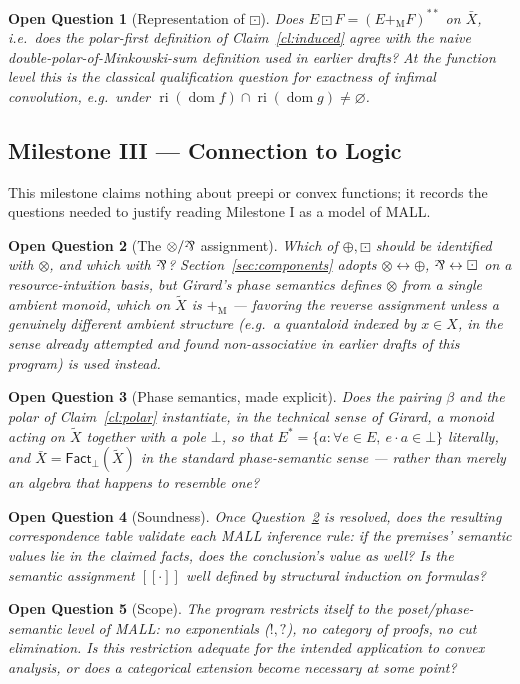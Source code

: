 \documentclass[11pt]{article}
\newtheorem{question}{Open Question}
\newcommand{\dom}{\operatorname{dom}}
\newcommand{\Msum}{+_{\mathrm M}}
\newcommand{\Fact}{\mathsf{Fact}}
\newcommand{\parr}{\mathbin{\text{\rotatebox[origin=c]{180}{\&}}}}
\newcommand{\ri}{\operatorname{ri}}
\providecommand{\llbracket}{[\![}
\providecommand{\rrbracket}{]\!]}
\begin{document}
\begin{question}[Representation of $\boxdot$]\label{q:representation}
Does $E\boxdot F=(E\Msum F)^{**}$ on $\bar X$, i.e.\ does the polar-first
definition of Claim~\ref{cl:induced} agree with the naive
double-polar-of-Minkowski-sum definition used in earlier drafts? At the
function level this is the classical qualification question for exactness
of infimal convolution, e.g.\ under $\ri(\dom f)\cap\ri(\dom g)\ne\varnothing$.
\end{question}

\subsection*{Milestone III --- Connection to Logic}

This milestone claims nothing about preepi or convex functions; it records
the questions needed to justify reading Milestone I as a model of MALL.

\begin{question}[The $\otimes/\parr$ assignment]\label{q:swap}
Which of $\oplus,\boxdot$ should be identified with $\otimes$, and which
with $\parr$? Section~\ref{sec:components} adopts
$\otimes\leftrightarrow\oplus$, $\parr\leftrightarrow\boxdot$ on a
resource-intuition basis, but Girard's phase semantics defines $\otimes$
from a single ambient monoid, which on $\tilde X$ is $\Msum$ — favoring
the reverse assignment unless a genuinely different ambient structure
(e.g.\ a quantaloid indexed by $x\in X$, in the sense already attempted
and found non-associative in earlier drafts of this program) is used
instead.
\end{question}

\begin{question}[Phase semantics, made explicit]
Does the pairing $\beta$ and the polar of Claim~\ref{cl:polar} instantiate,
in the technical sense of Girard, a monoid acting on $\tilde X$ together
with a pole $\bot$, so that $E^*=\{a:\forall e\in E,\ e\cdot a\in\bot\}$
literally, and $\bar X=\Fact_\bot(\tilde X)$ in the standard phase-semantic
sense — rather than merely an algebra that happens to resemble one?
\end{question}

\begin{question}[Soundness]
Once Question~\ref{q:swap} is resolved, does the resulting correspondence
table validate each MALL inference rule: if the premises' semantic values
lie in the claimed facts, does the conclusion's value as well? Is the
semantic assignment $\llbracket\cdot\rrbracket$ well defined by structural
induction on formulas?
\end{question}

\begin{question}[Scope]
The program restricts itself to the poset/phase-semantic level of MALL:
no exponentials ($!,?$), no category of proofs, no cut elimination. Is this
restriction adequate for the intended application to convex analysis, or
does a categorical extension become necessary at some point?
\end{question}
\end{document}
